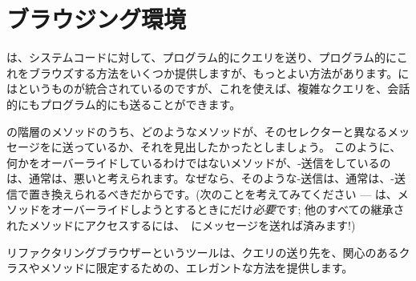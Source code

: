 \documentclass[a4paper,10pt,twoside]{book}
\begin{document}
\section{ブラウジング環境}

は、システムコードに対して、プログラム的にクエリを送り、プログラム的にこれをブラウズする方法をいくつか提供しますが、もっとよい方法があります。\pharo にはというものが統合されているのですが、これを使えば、複雑なクエリを、会話的にもプログラム的にも送ることができます。

の階層のメソッドのうち、どのようなメソッドが、そのセレクターと異なるメッセージを\super に送っているか、それを見出したかったとしましょう。
このように、何かをオーバーライドしているわけではないメソッドが、\super-送信をしているのは、通常は、悪いと考えられます。なぜなら、そのような\super-送信は、通常は、\self-送信で置き換えられるべきだからです。(次のことを考えてみてください --- \super は、メソッドをオーバーライドしようとするときにだけ\emph{必要}です; 他のすべての継承されたメソッドにアクセスするには、\self　にメッセージを送れば済みます!)

リファクタリングブラウザーというツールは、クエリの送り先を、関心のあるクラスやメソッドに限定するための、エレガントな方法を提供します。
\end{document}
